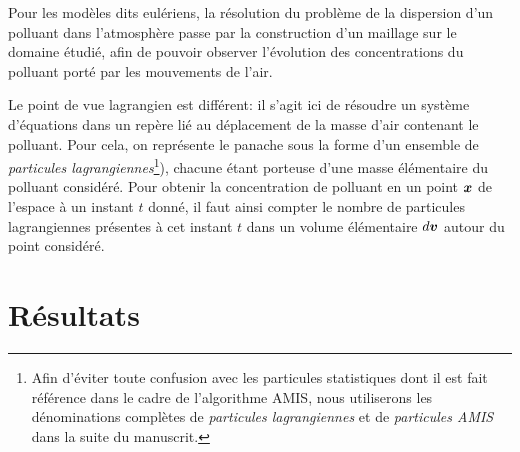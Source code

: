 Pour les modèles dits eulériens, la résolution du problème de la dispersion d'un polluant dans l'atmosphère passe par la construction d'un maillage sur le domaine étudié, afin de pouvoir observer l'évolution des concentrations du polluant porté par les mouvements de l'air. 

Le point de vue lagrangien est différent: il s'agit ici de résoudre un système d'équations dans un repère lié au déplacement de la masse d'air contenant le polluant. Pour cela, on représente le panache sous la forme d'un ensemble de \textit{particules lagrangiennes}\footnote{Afin d'éviter toute confusion avec les particules statistiques dont il est fait référence dans le cadre de l'algorithme AMIS, nous utiliserons les dénominations complètes  de \textit{particules lagrangiennes} et de \textit{particules AMIS} dans la suite du manuscrit.}), chacune étant porteuse d'une masse élémentaire du polluant considéré. Pour obtenir la concentration de polluant en un point ${\bm{x}}$ de l'espace à un instant $t$ donné, il faut ainsi compter le nombre de particules lagrangiennes présentes à cet instant $t$ dans un volume élémentaire $d{\bm{v}}$ autour du point considéré. 



\section{Résultats}

